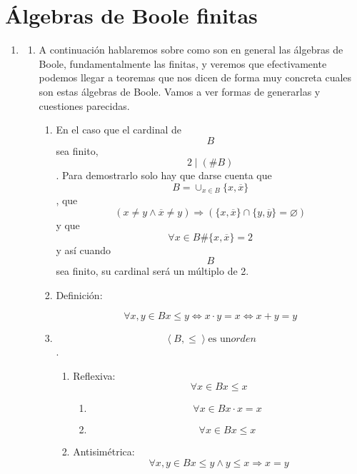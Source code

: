 \chapter{Álgebras de Boole finitas}

\begin{enumerate}
\def\labelenumi{\arabic{enumi}.}
\item
  \begin{enumerate}
  \def\labelenumii{\arabic{enumii}.}
  \item
    A continuación hablaremos sobre como son en general las álgebras de
    Boole, funda\-mentalmente las finitas, y veremos que efectivamente
    podemos llegar a teoremas que nos dicen de forma muy concreta cuales
    son estas álgebras de Boole. Vamos a ver for\-mas de generarlas y
    cuestiones parecidas.

    \begin{enumerate}
    \def\labelenumiii{\arabic{enumiii}.}
    \item
      En el caso que el cardinal de \[B\]sea finito,
      \[2 \mid {({\# B})}\]. Para demostrarlo solo hay que darse cuenta
      que \[{B = \cup_{x \in B}}{\{{x,\overline{x}}\}}\], que
      \[{({{x \neq {y \land \overline{x}}} \neq y})}\Rightarrow{({{{\{{x,\overline{x}}\}} \cap {\{{y,\overline{y}}\}}} = \varnothing})}\]
      y que \[\forall{x \in B}\#{{\{{x,\overline{x}}\}} = 2}\] y así
      cuando\[B\]sea finito, su cardinal será un múlti\-plo de 2.
    \item
      Definición:

      \[\forall x,{y \in B}{x \leq y}\Leftrightarrow{{x \cdot y} = x}\Leftrightarrow{{x + y} = y}\]
    \item
      \[\left\langle {B, \leq} \right\rangle\text{es un}\mathit{orden}\].

      \begin{enumerate}
      \def\labelenumiv{\arabic{enumiv}.}
      \item
        Reflexiva: \[\forall{x \in B}{x \leq x}\]

        \begin{enumerate}
        \def\labelenumv{\arabic{enumv}.}
        \tightlist
        \item
          \[\forall{x \in B}{{x \cdot x} = x}\]
        \item
          \[\forall{x \in B}{x \leq x}\]
        \end{enumerate}
      \item
        Antisimétrica:
        \[\forall x,{y \in B}{{x \leq {y \land y}} \leq x}\Rightarrow{x = y}\]


\end{enumerate}
\end{enumerate}
\end{enumerate}
\end{enumerate}
